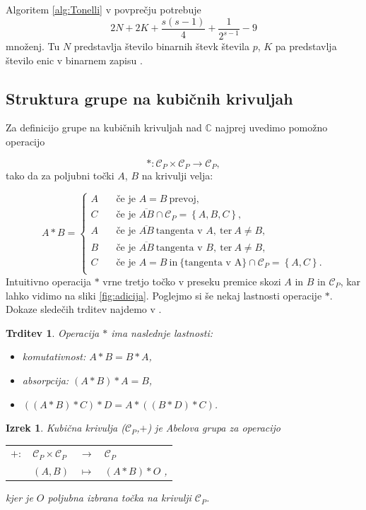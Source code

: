 \documentclass[12pt,a4paper,twoside]{article}
\theoremstyle{definition} %
\theoremstyle{plain} %
\newtheorem{izrek}[definicija]{Izrek}
\newtheorem{trditev}[definicija]{Trditev}
\numberwithin{equation}{section}  %
\renewcommand{\C}{\mathbb C}
\begin{document}
Algoritem \ref{alg:Tonelli} v povprečju potrebuje
$$2N+2K+\frac{s(s-1)}{4}+\frac{1}{2^{s-1}}-9$$
množenj. Tu $N$ predstavlja število binarnih števk števila $p$, $K$ pa predstavlja število enic v binarnem zapisu \cite{Tornaria2002}.

\subsection{Struktura grupe na kubičnih krivuljah}


Za definicijo grupe na kubičnih krivuljah nad $\C$ najprej uvedimo pomožno operacijo

$$\ast : \mathcal{C}_P \times \mathcal{C}_P \rightarrow \mathcal{C}_P,$$
tako da za poljubni točki $A$, $B$ na krivulji velja:

\[ A \ast B =
\begin{cases}
A & \quad \text{če je } A=B \ \text{prevoj},\\
C & \quad \text{če je } \overline{AB} \cap \mathcal{C}_P = \left\{ A,B,C \right\},\\
A & \quad \text{če je } \overline{AB} \ \text{tangenta v } A,\ \text{ter} \ A \neq B,\\
B & \quad \text{če je } \overline{AB} \ \text{tangenta v } B,\ \text{ter} \ A \neq B,\\
C &\quad \text{če je } A=B \  \text{in}\ \{\text{tangenta v A}\} \cap \mathcal{C}_P = \left\{ A,C \right\}.\\
\end{cases}
\]
Intuitivno operacija $\ast$ vrne tretjo točko v preseku premice skozi $A$ in $B$ in $\mathcal{C}_P$, kar lahko vidimo na sliki \ref{fig:adicija}. Poglejmo si še nekaj lastnosti operacije $\ast$. Dokaze sledečih trditev najdemo v \cite[Poglavje 17.3]{Gibson1999}.

\begin{trditev}
\label{last zvezda}
Operacija $\ast$ ima naslednje lastnosti:

\begin{itemize}
\item komutativnost: $ A \ast B = B \ast A$,
\item absorpcija: $(A \ast B ) \ast A = B$,
\item $((A \ast B) \ast C ) \ast D = A \ast ((B \ast D)\ast C)$.
\end{itemize}
\end{trditev}

\begin{izrek}
Kubična krivulja ($\mathcal{C}_P$,$+$) je Abelova grupa za operacijo

\begin{table}[ht]
\centering
\begin{tabular}{llll}
$+:$ & $\mathcal{C}_P \times \mathcal{C}_P$ & $\rightarrow$ & $\mathcal{C}_P$ \\
& $(A,B)$ & $\mapsto$ & $(A\ast B)\ast O$ ,
\end{tabular}
\end{table}
kjer je $O$ poljubna izbrana točka na krivulji $ \mathcal{C}_P$.
\end{izrek}
\end{document}
